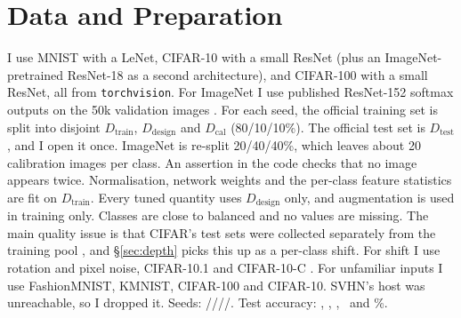 \documentclass{article}
\begin{document}
\section{Data and Preparation}
I use MNIST with a LeNet, CIFAR-10 with a small ResNet (plus an ImageNet-pretrained ResNet-18 as a second architecture), and CIFAR-100
with a small ResNet, all from \texttt{torchvision}. For ImageNet I use published ResNet-152 softmax outputs on the 50k validation
images \citep{angelopoulos2021uncertainty}. For each seed, the official training set is split into disjoint $D_\text{train}$,
$D_\text{design}$ and $D_\text{cal}$ (80/10/10\%). The official test set is $D_\text{test}$, and I open it once. ImageNet is re-split
20/40/40\%, which leaves about 20 calibration images per class. An assertion in the code checks that no image appears twice.
Normalisation, network weights and the per-class feature statistics are fit on $D_\text{train}$. Every tuned quantity uses $D_\text{design}$ only, and
augmentation is used in training only. Classes are close to balanced and no values are missing. The main quality issue is that
CIFAR's test sets were collected separately from the training pool \citep{recht2018cifar}, and \S\ref{sec:depth} picks this up as a
per-class shift. For shift I use rotation and pixel noise, CIFAR-10.1 \citep{recht2018cifar} and CIFAR-10-C
\citep{hendrycks2019benchmarking}. For unfamiliar inputs I use FashionMNIST, KMNIST, CIFAR-100 and CIFAR-10. SVHN's host was
unreachable, so I dropped it. Seeds: \SeedsMNIST/\SeedsCTen/\SeedsCTenR/\SeedsCHun/\SeedsINet. Test accuracy: \AccMNIST, \AccCTen,
\AccCTenR, \AccCHun\ and \AccINet\%.
\end{document}

